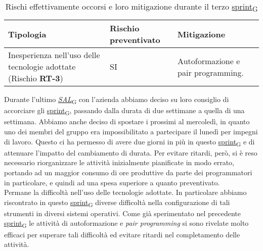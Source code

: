 \begin{table}[!h]
	\centering
	\begin{tabular}{ | p{6cm} | p{2.5cm} | p{7.5cm} | }
		\hline
		\textbf{Tipologia}                                                      & \textbf{Rischio preventivato} & \textbf{Mitigazione}               \\
		\hline
		Inesperienza nell'uso delle tecnologie adottate (Rischio \textbf{RT-3}) & SI                            & Autoformazione e pair programming. \\
		\hline
	\end{tabular}
	\caption{Rischi effettivamente occorsi e loro mitigazione durante il terzo \href{https://7last.github.io/docs/rtb/documentazione-interna/glossario\#sprint}{sprint\textsubscript{G}}}
	
\end{table}

Durante l'ultimo \href{https://7last.github.io/docs/rtb/documentazione-interna/glossario\#stato-avanzamento-lavori}{\textit{SAL}\textsubscript{G}} con l'azienda abbiamo deciso su loro consiglio di accorciare gli \href{https://7last.github.io/docs/rtb/documentazione-interna/glossario\#sprint}{sprint\textsubscript{G}}, passando dalla durata di due settimane a quella di una settimana. Abbiamo anche deciso di spostare i prossimi al mercoledì, in quanto uno dei membri del gruppo era impossibilitato a partecipare il lunedì per impegni di lavoro. Questo ci ha permesso di avere due giorni in più in questo \href{https://7last.github.io/docs/rtb/documentazione-interna/glossario\#sprint}{sprint\textsubscript{G}} e di attenuare l'impatto del cambiamento di durata. Per evitare ritardi, però, si è reso necessario riorganizzare le attività inizialmente pianificate in modo errato, portando ad un maggior consumo di ore produttive da parte dei programmatori in particolare, e quindi ad una spesa superiore a quanto preventivato. \\
Permane la difficoltà nell'uso delle tecnologie adottate. In particolare abbiamo riscontrato in questo \href{https://7last.github.io/docs/rtb/documentazione-interna/glossario\#sprint}{sprint\textsubscript{G}} diverse difficoltà nella configurazione di tali strumenti in diversi sistemi operativi. Come già sperimentato nel precedente \href{https://7last.github.io/docs/rtb/documentazione-interna/glossario\#sprint}{sprint\textsubscript{G}} le attività di autoformazione e \textit{pair programming} si sono rivelate molto efficaci per superare tali difficoltà ed evitare ritardi nel completamento delle attività.



